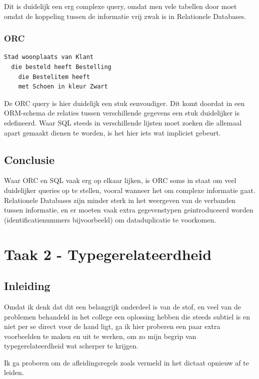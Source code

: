 \documentclass[11pt]{article}
\begin{document}
Dit is duidelijk een erg complexe query, omdat men vele tabellen door moet
omdat de koppeling tussen de informatie vrij zwak is in Relationele Databases.

\subsubsection{ORC}

\begin{verbatim}
Stad woonplaats van Klant 
  die besteld heeft Bestelling
    die Bestelitem heeft 
    met Schoen in kleur Zwart
\end{verbatim}

De ORC query is hier duidelijk een stuk eenvoudiger. Dit komt doordat in een
ORM-schema de relaties tussen verschillende gegevens een stuk duidelijker is
edefineerd. Waar SQL steeds in verschillende lijsten moet zoeken die allemaal
apart gemaakt dienen te worden, is het hier iets wat impliciet gebeurt.

\subsection{Conclusie} 

Waar ORC en SQL vaak erg op elkaar lijken, is ORC soms in staat om veel
duidelijker queries op te stellen, vooral wanneer het om complexe informatie
gaat. Relationele Databases zijn minder sterk in het weergeven van de verbanden
tussen informatie, en er moeten vaak extra gegevenstypen geintroduceerd worden
(identificatienummers bijvoorbeeld) om dataduplicatie te voorkomen.

\section{Taak 2 - Typegerelateerdheid}

\subsection{Inleiding}
Omdat ik denk dat dit een belangrijk onderdeel is van de stof, en veel van de
problemen behandeld in het college een oplossing hebben die steeds subtiel is 
en niet per se direct voor de hand ligt, ga ik hier proberen een paar extra
voorbeelden te maken en uit te werken, om zo mijn begrip van 
typegerelateerdheid wat scherper te krijgen.

Ik ga proberen om de afleidingsregels zoals vermeld in het dictaat 
\cite[p.~41]{dictaat} opnieuw af te leiden.
\end{document}
